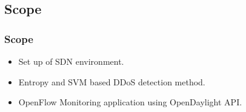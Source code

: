 \documentclass[10pt]{beamer}
\begin{document}
\begin{frame}
\section[]{Scope}
\frametitle{Scope}
\begin{center}
\begin{itemize}
\footnotesize
\item
Set up of SDN environment.
\item
Entropy and SVM based DDoS detection method.
\item
OpenFlow Monitoring application using OpenDaylight API.
\end{itemize}
\end{center}
\end{frame}











\end{document}
